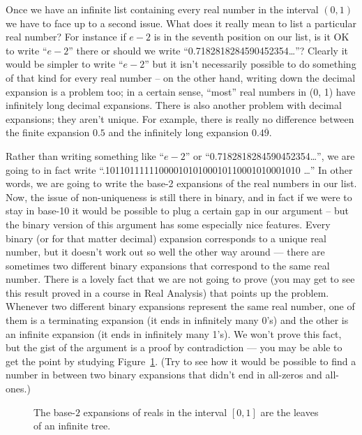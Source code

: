 Once we have an infinite list containing every real number in the interval
$(0, 1)$ we have to face up to a second issue.  What does it really mean
to list a particular real number? For instance if $e-2$ is in the seventh
position on our list, is it OK to write ``$e-2$'' there or should we write
``0.7182818284590452354\ldots''?  Clearly it would be simpler to write 
``$e-2$'' but it isn't necessarily possible to do something of that kind 
for every real
number -- on the other hand, writing down the decimal expansion is a problem
too; in a certain sense, ``most'' real numbers in (0, 1) have infinitely long
decimal expansions.  There is also another problem with decimal expansions;
they aren't unique.  For example, there is really no difference between the
finite expansion $0.5$ and the infinitely long expansion  $0.4\overline{9}$.

Rather than writing something like ``$e-2$'' or ``0.7182818284590452354\ldots'',
we are going to in fact write ``.1011011111100001010100010110001010001010 \ldots''
In other words, we are going to write the base-2 expansions of the real numbers
in our list.  Now, the issue of non-uniqueness is still there in binary, and
in fact if we were to stay in base-10 it would be possible to plug a certain
gap in our argument -- but the binary version of this argument has some
especially nice features.
Every binary (or for that matter decimal) expansion corresponds to a unique 
real number, but it doesn't work out so well the other way around ---
there are sometimes two different binary expansions that correspond to the
same real number.  There is a lovely fact that we are not going to prove (you
may get to see this result proved in a course in Real Analysis) that points up
the problem.  Whenever two different binary expansions represent the same
real number, one of them is a terminating expansion (it ends in infinitely
many 0's) and the other is an infinite expansion (it ends in infinitely many
1's).  We won't prove this fact, but the gist of the argument is a proof by
contradiction --- you may be able to get the point by studying Figure~\ref{fig:binary_reps}.
(Try to see how it would be possible to find a number in between two binary
expansions that didn't end in all-zeros and all-ones.)

\begin{figure}[!hbtp]

\caption[Binary representations in the unit interval.]{The base-$2$ %
expansions of reals in the interval $[0, 1]$ are the leaves of an %
infinite tree.}
\label{fig:binary_reps} 
\end{figure}

